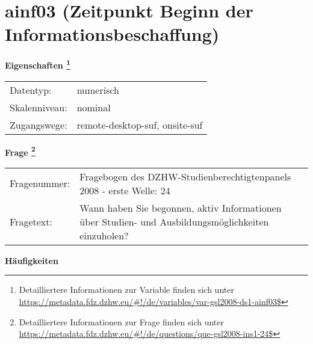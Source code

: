 
    \setcounter{footnote}{0}

    \vspace*{-1.8cm}
	\section{ainf03 (Zeitpunkt Beginn der Informationsbeschaffung)}
	\label{section:ainf03}



    \vspace*{0.5cm}
    \noindent\textbf{Eigenschaften
	\footnote{Detailliertere Informationen zur Variable finden sich unter
		\url{https://metadata.fdz.dzhw.eu/\#!/de/variables/var-gsl2008-ds1-ainf03$}}}\\
	\begin{tabularx}{\hsize}{@{}lX}
	Datentyp: & numerisch \\
	Skalenniveau: & nominal \\
	Zugangswege: &
	  remote-desktop-suf, 
	  onsite-suf
 \\
    \end{tabularx}



				\vspace*{0.5cm}
                \noindent\textbf{Frage
	                \footnote{Detailliertere Informationen zur Frage finden sich unter
		              \url{https://metadata.fdz.dzhw.eu/\#!/de/questions/que-gsl2008-ins1-24$}}}\\
				\begin{tabularx}{\hsize}{@{}lX}
					Fragenummer: &
					  Fragebogen des DZHW-Studienberechtigtenpanels 2008 - erste Welle:
					  24
 \\
					Fragetext: & Wann haben Sie begonnen, aktiv Informationen über Studien- und Ausbildungsmöglichkeiten einzuholen? \\
				\end{tabularx}





        		\vspace*{0.5cm}
                \noindent\textbf{Häufigkeiten}

